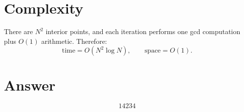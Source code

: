\documentclass[12pt]{article}
\begin{document}
\section{Complexity}

There are $N^2$ interior points, and each iteration performs one gcd computation plus $O(1)$ arithmetic. Therefore:
\[
\text{time}=O(N^2\log N),\qquad \text{space}=O(1).
\]

\section{Answer}

\[
\boxed{14234}
\]
\end{document}
